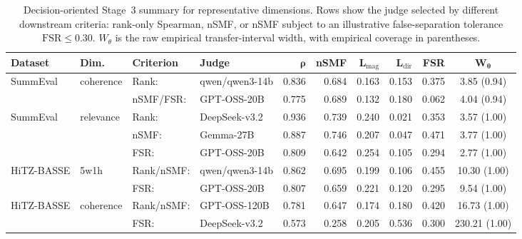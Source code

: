\begin{table}[t]
\centering
\scriptsize
\setlength{\tabcolsep}{2.6pt}
\caption{
Decision-oriented Stage~3 summary for representative dimensions. Rows show the judge selected by different downstream criteria: rank-only Spearman, nSMF, or nSMF subject to an illustrative false-separation tolerance $\mathrm{FSR}\le 0.30$. $W_\theta$ is the raw empirical transfer-interval width, with empirical coverage in parentheses.
}
\label{tab:stage3-decision-summary}
\begin{tabular}{ll l l rrrrr c}
\toprule
\textbf{Dataset} & \textbf{Dim.} & \textbf{Criterion} & \textbf{Judge} & $\boldsymbol{\rho}$ & \textbf{nSMF} & $\mathbf{L_{\mathrm{mag}}}$ & $\mathbf{L_{\mathrm{dir}}}$ & \textbf{FSR} & $\boldsymbol{W_{\theta}}$ \\
\midrule
SummEval & coherence & Rank: & qwen/qwen3-14b & 0.836 & 0.684 & 0.163 & 0.153 & 0.375 & 3.85 (0.94) \\
 &  & nSMF/FSR: & GPT-OSS-20B & 0.775 & 0.689 & 0.132 & 0.180 & 0.062 & 4.04 (0.94) \\
\midrule
SummEval & relevance & Rank: & DeepSeek-v3.2 & 0.936 & 0.739 & 0.240 & 0.021 & 0.353 & 3.57 (1.00) \\
 &  & nSMF: & Gemma-27B & 0.887 & 0.746 & 0.207 & 0.047 & 0.471 & 3.77 (1.00) \\
 &  & FSR: & GPT-OSS-20B & 0.809 & 0.642 & 0.254 & 0.105 & 0.294 & 2.77 (1.00) \\
\midrule
HiTZ-BASSE & 5w1h & Rank/nSMF: & qwen/qwen3-14b & 0.862 & 0.695 & 0.199 & 0.106 & 0.455 & 10.30 (1.00) \\
 &  & FSR: & GPT-OSS-20B & 0.807 & 0.659 & 0.221 & 0.120 & 0.295 & 9.54 (1.00) \\
\midrule
HiTZ-BASSE & coherence & Rank/nSMF: & GPT-OSS-120B & 0.781 & 0.647 & 0.174 & 0.180 & 0.420 & 16.73 (1.00) \\
 &  & FSR: & DeepSeek-v3.2 & 0.573 & 0.258 & 0.205 & 0.536 & 0.300 & 230.21 (1.00) \\
\bottomrule
\end{tabular}
\end{table}